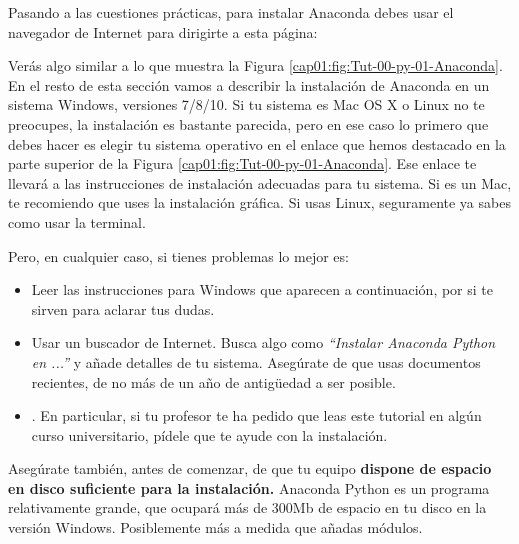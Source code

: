 \documentclass[10pt,a4paper]{article}\usepackage[]{graphicx}\usepackage[]{color}
\newcounter {cont01}
\begin{document}
Pasando a las cuestiones prácticas, para instalar Anaconda debes usar el  navegador de Internet para dirigirte a esta página:
\begin{center}
\end{center}
Verás algo similar a lo que muestra la Figura \ref{cap01:fig:Tut-00-py-01-Anaconda}. En el resto de esta sección vamos a describir la instalación de Anaconda en un sistema Windows, versiones 7/8/10. Si tu sistema es Mac OS X o Linux no te preocupes, la instalación es bastante parecida, pero en ese caso lo primero que debes hacer es elegir tu sistema operativo en el enlace que hemos destacado en la parte superior de la Figura \ref{cap01:fig:Tut-00-py-01-Anaconda}. Ese enlace te llevará a las instrucciones de instalación adecuadas para tu sistema. Si es un Mac, te recomiendo que uses la instalación gráfica. Si usas Linux,  seguramente ya sabes como usar la terminal.

Pero, en cualquier caso, si tienes problemas lo mejor es:
\begin{itemize}
  \item Leer las instrucciones para Windows que aparecen a continuación, por si te sirven para aclarar tus dudas.
  \item Usar un buscador de Internet. Busca algo como {\em ``Instalar Anaconda Python en ...''} y añade detalles de tu sistema. Asegúrate de que usas documentos recientes, de no más de un año de antigüedad a ser posible.
  \item {}. En particular, si tu profesor te ha pedido que leas este tutorial en algún curso universitario, pídele que te ayude con la instalación.
\end{itemize}

Asegúrate también, antes de comenzar, de que tu equipo {\bf dispone de espacio en disco suficiente para la instalación.} Anaconda Python es un programa relativamente grande, que ocupará más de 300Mb de espacio en tu disco en la versión Windows. Posiblemente más a medida que añadas módulos.
\end{document}
